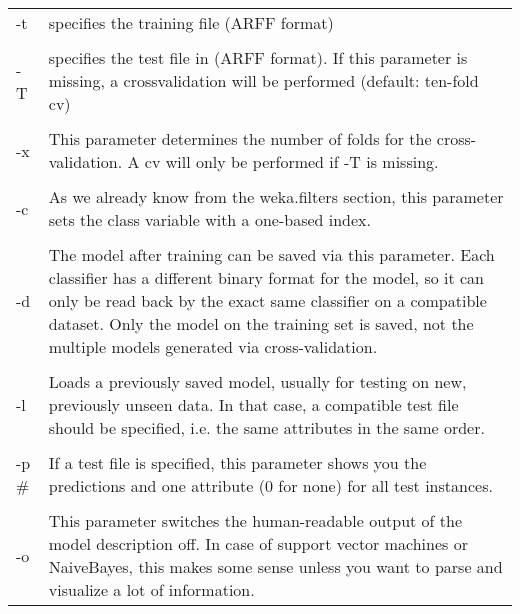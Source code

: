 \vspace{0.5cm}
\noindent
\begin{tabular}{l l}
-t 
& 
\begin{minipage}{10cm}
specifies the training file (ARFF format) 
\end{minipage}
\\
\\

-T 
& 
\begin{minipage}{10cm}
specifies the test file in (ARFF format). If this parameter is missing, a crossvalidation will be performed (default: ten-fold cv) 
\end{minipage}
\\
\\

-x 
& 
\begin{minipage}{10cm}
This parameter determines the number of folds for the cross-validation. A cv will only be performed if -T is missing. 
\end{minipage}
\\
\\

-c 
& 
\begin{minipage}{10cm}
As we already know from the weka.filters section, this parameter sets the class variable with a one-based index. 
\end{minipage}
\\
\\

-d 
& 
\begin{minipage}{10cm}
The model after training can be saved via this parameter. Each classifier has a different binary format for the model, so it can only be read back by the exact same classifier on a compatible dataset. Only the model on the training set is saved, not the multiple models generated via cross-validation. 
\end{minipage}
\\
\\

-l 
& 
\begin{minipage}{10cm}
Loads a previously saved model, usually for testing on new, previously unseen data. In that case, a compatible test file should be specified, i.e. the same attributes in the same order. 
\end{minipage}
\\
\\

-p \# 
& 
\begin{minipage}{10cm}
If a test file is specified, this parameter shows you the predictions and one attribute (0 for none) for all test instances. 
\end{minipage}
\\
\\

-o 
& 
\begin{minipage}{10cm}
This parameter switches the human-readable output of the model description off. In case of support vector machines or NaiveBayes, this makes some sense unless you want to parse and visualize a lot of information. 
\end{minipage}
\\
\end{tabular}
